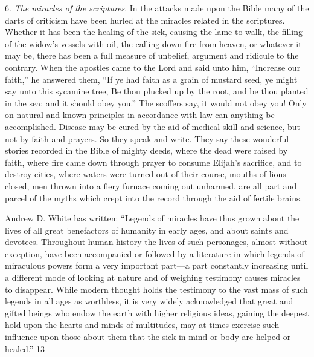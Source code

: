 6. \textit{The miracles of the scriptures}. In the attacks made upon the Bible many of the darts of
criticism have been hurled at the miracles related in the scriptures. Whether it has been the
healing of the sick, causing the lame to walk, the filling of the widow's vessels with oil, the
calling down fire from heaven, or whatever it may be, there has been a full measure of
unbelief, argument and ridicule to the contrary. When the apostles came to the Lord and said
unto him, ``Increase our faith,'' he answered them, ``If ye had faith as a grain of mustard seed,
ye might say unto this sycamine tree, Be thou plucked up by the root, and be thou planted in
the sea; and it should obey you.'' The scoffers say, it would not obey you! Only on natural
and known principles in accordance with law can anything be accomplished. Disease may be
cured by the aid of medical skill and science, but not by faith and prayers. So they speak and
write. They say these wonderful stories recorded in the Bible of mighty deeds, where the
dead were raised by faith, where fire came down through prayer to consume Elijah's
sacrifice, and to destroy cities, where waters were turned out of their course, mouths of lions
closed, men thrown into a fiery furnace coming out unharmed, are all part and parcel of the
myths which crept into the record through the aid of fertile brains.

Andrew D. White has written: ``Legends of miracles have thus grown about the lives of all
great benefactors of humanity in early ages, and about saints and devotees. Throughout
human history the lives of such personages, almost without exception, have been
accompanied or followed by a literature in which legends of miraculous powers form a very
important part—a part constantly increasing until a different mode of looking at nature and of
weighing testimony causes miracles to disappear. While modern thought holds the testimony
to the vast mass of such legends in all ages as worthless, it is very widely acknowledged that
great and gifted beings who endow the earth with higher religious ideas, gaining the deepest
hold upon the hearts and minds of multitudes, may at times exercise such influence upon
those about them that the sick in mind or body are helped or healed.'' 13


